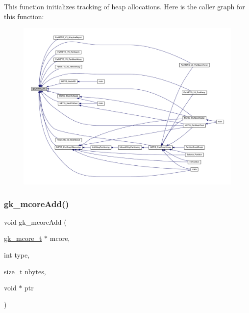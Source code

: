 This function initializes tracking of heap allocations. Here is the caller graph for this function\+:\nopagebreak
\begin{figure}[H]
\begin{center}
\leavevmode
\includegraphics[width=350pt]{a00077_a24633cc1c72a7e92836912c2adcf570a_icgraph}
\end{center}
\end{figure}
\mbox{\label{a00077_a366348b623d380f773e5946011e14059}} 
\subsubsection{\texorpdfstring{gk\+\_\+mcore\+Add()}{gk\_mcoreAdd()}}
{\footnotesize\ttfamily void gk\+\_\+mcore\+Add (\begin{DoxyParamCaption}\item[{\hyperlink{a00682}{gk\+\_\+mcore\+\_\+t} $\ast$}]{mcore,  }\item[{int}]{type,  }\item[{size\+\_\+t}]{nbytes,  }\item[{void $\ast$}]{ptr }\end{DoxyParamCaption})}

